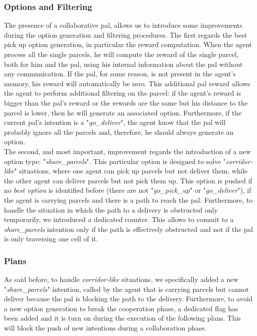             \subsubsection{Options and Filtering}
                The presence of a collaborative pal, allows us to introduce some improvements during the option generation and filtering procedures. The first regards the best pick up option generation, in particular the reward computation. When the agent process all the single parcels, he will compute the reward of the single parcel, both for him and the pal, using his internal information about the pal without any communication. If the pal, for some reason, is not present in the agent's memory, his reward will automatically be zero. This additional pal reward allows the agent to perform additional filtering on the parcel: if the agent's reward is bigger than the pal's reward or the rewards are the same but his distance to the parcel is lower, then he will generate an associated option. Furthermore, if the current pal's intention is a "\textit{go\_deliver}", the agent know that the pal will probably ignore all the parcels and, therefore, he should always generate an option.
                \medskip\\
                The second, and most important, improvement regards the introduction of a new option type: "\textit{share\_parcels}". This particular option is designed to solve "\textit{corridor-like}" situations, where one agent can pick up parcels but not deliver them, while the other agent can deliver parcels but not pick them up. This option is pushed if no \textit{best option} is identified before (there are not "\textit{go\_pick\_up}" or "\textit{go\_deliver}"), if the agent is carrying parcels and there is a path to reach the pal. Furthermore, to handle the situation in which the path to a delivery is obstructed only temporarily, we introduced a dedicated counter. This allows to commit to a \textit{share\_parcels} intention only if the path is effectively obstructed and not if the pal is only traversing one cell of it.
            
            \subsubsection{Plans}\label{shareRequest}
                As said before, to handle \textit{corridor-like} situations, we specifically added a new "\textit{share\_parcels}" intention, called by the agent that is carrying parcels but cannot deliver because the pal is blocking the path to the delivery. Furthermore, to avoid a new option generation to break the cooperation phase, a dedicated flag has been added and it is turn on during the execution of the following plans. This will block the push of new intentions during a collaboration phase.

